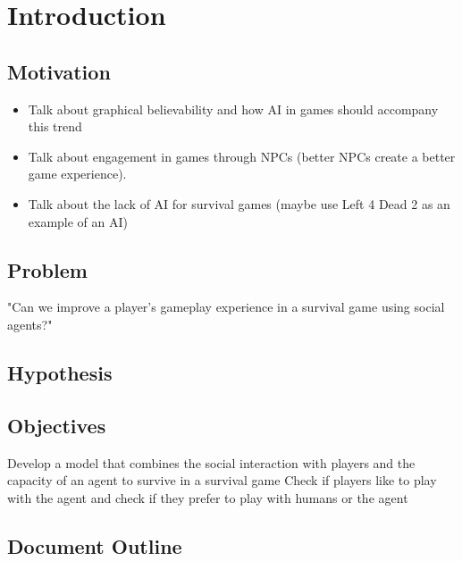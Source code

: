 \section{Introduction}

\subsection{Motivation}

\begin{itemize}
	\item Talk about graphical believability and how AI in games should accompany this trend
	\item Talk about engagement in games through NPCs (better NPCs create a better game experience).
	\item Talk about the lack of AI for survival games (maybe use Left 4 Dead 2 as an example of an AI)
\end{itemize}

\subsection{Problem}
"Can we improve a player's gameplay experience in a survival game using social agents?"

\subsection{Hypothesis}


\subsection{Objectives}
Develop a model that combines the social interaction with players and the capacity of an agent to survive in a survival game
Check if players like to play with the agent
and check if they prefer to play with humans or the agent

\subsection{Document Outline}